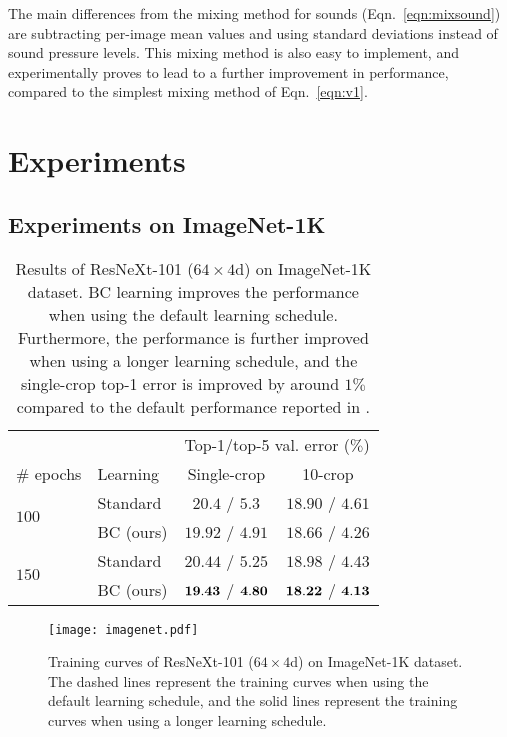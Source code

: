 \documentclass[10pt,twocolumn,letterpaper]{article}
\begin{document}
The main differences from the mixing method for sounds (Eqn.~\ref{eqn:mixsound}) are subtracting per-image mean values and using standard deviations instead of sound pressure levels. This mixing method is also easy to implement, and experimentally proves to lead to a further improvement in performance, compared to the simplest mixing method of Eqn.~\ref{eqn:v1}.



\section{Experiments}\label{4}
\subsection{Experiments on ImageNet-1K}
\begin{table}
	\centering
	\caption{Results of ResNeXt-101 ($64\times4$d) \cite{xie2017aggregated} on ImageNet-1K dataset. BC learning improves the performance when using the default learning schedule. Furthermore, the performance is further improved when using a longer learning schedule, and the single-crop  top-1 error is improved by around $1\%$ compared to the default performance reported in \cite{xie2017aggregated}.}
	\label{tab:imagenet}
	\vspace{2mm}
	\small
	\begin{tabular}{llcc}
		\toprule
		&& \multicolumn{2}{c}{Top-1/top-5 val. error ($\%$)} \\
		\cmidrule{3-4}
		\# epochs & Learning & Single-crop & 10-crop \\
		\midrule
		\multirow{2}{*}{$100$} & Standard & $20.4$ / $5.3$ \cite{xie2017aggregated} & $18.90$ / $4.61$ \\	
						& BC (ours) & $19.92$ / $4.91$ & $18.66$ / $4.26$ \\
		\midrule
		\multirow{2}{*}{$150$} & Standard & $20.44$ / $5.25$ & $18.98$ / $4.43$\\
						& BC (ours) & ${\bf 19.43}$ / ${\bf 4.80}$ & ${\bf 18.22}$ / ${\bf 4.13} $\\
		\bottomrule
	\end{tabular}
\end{table} 

\begin{figure}
	\centering
	\vspace{-4mm}
	\texttt{[image: imagenet.pdf]}	
		\caption{Training curves of ResNeXt-101 ($64\times4$d) on ImageNet-1K dataset. The dashed lines represent the training curves when using the default learning schedule, and the solid lines represent the training curves when using a longer learning schedule.}
		\label{fig:imagenet}
	\vspace{-2mm}
\end{figure}
\end{document}

